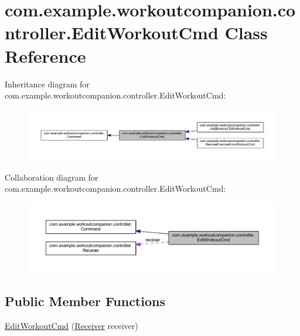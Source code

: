 \hypertarget{classcom_1_1example_1_1workoutcompanion_1_1controller_1_1_edit_workout_cmd}{\section{com.\-example.\-workoutcompanion.\-controller.\-Edit\-Workout\-Cmd Class Reference}
\label{classcom_1_1example_1_1workoutcompanion_1_1controller_1_1_edit_workout_cmd}
}


Inheritance diagram for com.\-example.\-workoutcompanion.\-controller.\-Edit\-Workout\-Cmd\-:
\nopagebreak
\begin{figure}[H]
\begin{center}
\leavevmode
\includegraphics[width=350pt]{classcom_1_1example_1_1workoutcompanion_1_1controller_1_1_edit_workout_cmd__inherit__graph}
\end{center}
\end{figure}


Collaboration diagram for com.\-example.\-workoutcompanion.\-controller.\-Edit\-Workout\-Cmd\-:
\nopagebreak
\begin{figure}[H]
\begin{center}
\leavevmode
\includegraphics[width=350pt]{classcom_1_1example_1_1workoutcompanion_1_1controller_1_1_edit_workout_cmd__coll__graph}
\end{center}
\end{figure}
\subsection*{Public Member Functions}
\begin{DoxyCompactItemize}
\item 
\hyperlink{classcom_1_1example_1_1workoutcompanion_1_1controller_1_1_edit_workout_cmd_a8d6241f5081888e0bec1a15c8051e6ec}{Edit\-Workout\-Cmd} (\hyperlink{classcom_1_1example_1_1workoutcompanion_1_1controller_1_1_receiver}{Receiver} receiver)
\end{DoxyCompactItemize}


